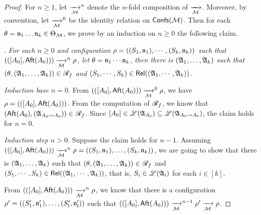 \begin{proof}
    For $n \ge 1$, let $\xrightarrow[{\mathcal{M} }]{}^n$ denote the $n$-fold composition of $\xrightarrow[{\mathcal{M} }]{}$. Moreover, by convention, let $\xrightarrow[{\mathcal{M} }]{}^0$ be the identity relation on ${\mathsf{Confs} }({\mathcal{M} })$. 
    Then for each $\theta = \mathfrak{n}_1 \dots \mathfrak{n}_k \in \Theta_{\mathcal{M} }$, we prove by an induction on $n \ge 0$ the following claim.
    
    \smallskip
    
    . \emph{For each $n \ge 0$ and configuration $\rho =  ((S_1, \mathfrak{n}_1), \cdots, (S_k, \mathfrak{n}_k))$ such that 
    $(([A_0], {\sf Aft}(A_0))) \xrightarrow[{\mathcal{M} }]{}^n \rho$, let $\theta = \mathfrak{n}_1 \cdots \mathfrak{n}_k$, then  
    there is  $({\mathfrak{A} }_1, \dots, {\mathfrak{A} }_k)$ such that $(\theta, ({\mathfrak{A} }_1, \dots, {\mathfrak{A} }_k)) \in \mathscr{R}_f$ and $(S_1, \cdots, S_k) \in \mathsf{Rel}(({\mathfrak{A} }_1,\cdots, {\mathfrak{A} }_k))$}.   
    
    
    \smallskip
    
    \noindent \emph{Induction base $n = 0$}. From $(([A_0], {\sf Aft}(A_0))) \xrightarrow[{\mathcal{M} }]{}^0 \rho$, we have $\rho = (([A_0], {\sf Aft}(A_0)))$. From the computation of $\mathscr{R}_f$, we know that $({\sf Aft}(A_0), ({\mathfrak{A} }_{A_0\rightsquigarrow A_0})) \in \mathscr{R}_f$. Since $[A_0] \in {\mathscr{L} }({\mathfrak{A} }_{A_0})\subseteq{\mathscr{L} }({\mathfrak{A} }_{A_0\rightsquigarrow A_0})$, the claim holds for $n = 0$. 
    
    \smallskip
    
    \noindent \emph{Induction step $n > 0$}. Suppose the claim holds for $n-1$. Assuming $(([A_0], {\sf Aft}(A_0))) \xrightarrow[{\mathcal{M} }]{}^n \rho =  ((S_1, \mathfrak{n}_1), \dots, (S_k, \mathfrak{n}_k))$, we are going to show that there is  $({\mathfrak{A} }_1, \dots, {\mathfrak{A} }_k)$ such that $(\theta, ({\mathfrak{A} }_1, \dots, {\mathfrak{A} }_k)) \in \mathscr{R}_f$ and $(S_1, \cdots, S_k) \in \mathsf{Rel}(({\mathfrak{A} }_1,\cdots, {\mathfrak{A} }_k))$, that is, $S_i \in {\mathscr{L} }({\mathfrak{A} }_i)$ for each $i \in [k]$. 
    
    From $(([A_0], {\sf Aft}(A_0))) \xrightarrow[{\mathcal{M} }]{}^n \rho$,  we know that there is a configuration $\rho' = ((S'_1, \mathfrak{n}'_1), \dots, (S'_l, \mathfrak{n}'_l))$ such that $(([A_0], {\sf Aft}(A_0))) \xrightarrow[{\mathcal{M} }]{}^{n-1} \rho' \xrightarrow[{\mathcal{M} }]{} \rho$.
    

\end{proof}
